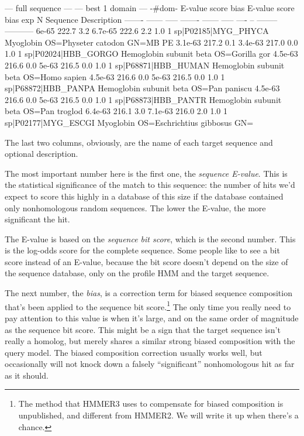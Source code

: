 \begin{sreoutput}
   --- full sequence ---   --- best 1 domain ---    -#dom-
    E-value  score  bias    E-value  score  bias    exp  N  Sequence              Description
    ------- ------ -----    ------- ------ -----   ---- --  --------              -----------
      6e-65  222.7   3.2    6.7e-65  222.6   2.2    1.0  1  sp|P02185|MYG_PHYCA   Myoglobin OS=Physeter catodon GN=MB PE
    3.1e-63  217.2   0.1    3.4e-63  217.0   0.0    1.0  1  sp|P02024|HBB_GORGO   Hemoglobin subunit beta OS=Gorilla gor
    4.5e-63  216.6   0.0      5e-63  216.5   0.0    1.0  1  sp|P68871|HBB_HUMAN   Hemoglobin subunit beta OS=Homo sapien
    4.5e-63  216.6   0.0      5e-63  216.5   0.0    1.0  1  sp|P68872|HBB_PANPA   Hemoglobin subunit beta OS=Pan paniscu
    4.5e-63  216.6   0.0      5e-63  216.5   0.0    1.0  1  sp|P68873|HBB_PANTR   Hemoglobin subunit beta OS=Pan troglod
    6.4e-63  216.1   3.0    7.1e-63  216.0   2.0    1.0  1  sp|P02177|MYG_ESCGI   Myoglobin OS=Eschrichtius gibbosus GN=
 \end{sreoutput}

The last two columns, obviously, are the name of each target sequence
and optional description.

The most important number here is the first one, the \emph{sequence
E-value}. This is the statistical significance of the match to this
sequence: the number of hits we'd expect to score this highly in a
database of this size if the database contained only nonhomologous
random sequences. The lower the E-value, the more significant the hit.

The E-value is based on the \emph{sequence bit score}, which is the
second number. This is the log-odds score for the complete sequence.
Some people like to see a bit score instead of an E-value, because the
bit score doesn't depend on the size of the sequence database, only on
the profile HMM and the target sequence.

The next number, the \emph{bias}, is a correction term for biased
sequence composition that's been applied to the sequence bit
score.\footnote{The method that HMMER3 uses to compensate for biased
composition is unpublished, and different from HMMER2. We will write
it up when there's a chance.} The only time you really need to pay
attention to this value is when it's large, and on the same order of
magnitude as the sequence bit score. This might be a sign that the
target sequence isn't really a homolog, but merely shares a similar
strong biased composition with the query model.  The biased
composition correction usually works well, but occasionally will not
knock down a falsely ``significant'' nonhomologous hit as far as it
should.

